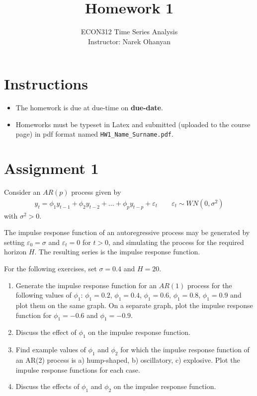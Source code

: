 \documentclass[12pt]{article}
\title{\textbf{Homework 1}}
\author{ECON312 Time Series Analysis \\ Instructor: Narek Ohanyan}
\date{}
\begin{document}
\maketitle


\section*{Instructions}

\begin{itemize}
    \item The homework is due at due-time on \textbf{due-date}.
    \item Homeworks must be typeset in Latex and submitted (uploaded to the course page) in pdf format named \verb|HW1_Name_Surname.pdf|.
\end{itemize}


\section*{Assignment 1}

Consider an $ AR(p) $ process given by
\begin{align*}
    y_{t} = \phi_1 y_{t-1} + \phi_2 y_{t-2} + \ldots + \phi_p y_{t-p} + \varepsilon_{t} \qquad \varepsilon_{t} \sim WN(0, \sigma^2)
\end{align*}
with $ \sigma^2 > 0 $.

The impulse response function of an autoregressive process may be generated by setting $ \varepsilon_{0} = \sigma $ and $ \varepsilon_{t} = 0 $ for $ t > 0 $, and simulating the process for the required horizon $ H $. The resulting series is the impulse response function.

For the following exercises, set $ \sigma = 0.4 $ and $ H = 20 $.

\begin{enumerate}
    \item Generate the impulse response function for an $ AR(1) $ process for the following values of $ \phi_1 $: $ \phi_1 = 0.2 $, $ \phi_1 = 0.4 $, $ \phi_1 = 0.6 $, $ \phi_1 = 0.8 $, $ \phi_1 = 0.9 $ and plot them on the same graph. On a separate graph, plot the impulse response function for $ \phi_1 = -0.6 $ and $ \phi_1 = -0.9 $.
    \item Discuss the effect of $ \phi_1 $ on the impulse response function.
    \item Find example values of $ \phi_1 $ and $ \phi_2 $ for which the impulse response function of an AR(2) process is a) hump-shaped, b) oscillatory, c) explosive. Plot the impulse response functions for each case.
    \item Discuss the effects of $ \phi_1 $ and $ \phi_2 $ on the impulse response function.
\end{enumerate}
\end{document}
